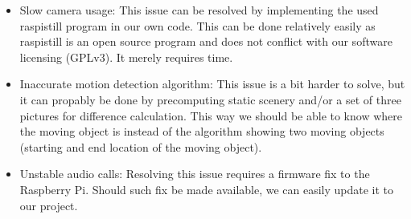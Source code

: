 \documentclass[english,11pt,twoside,a4paper]{article}
\begin{document}
\begin{itemize}
  \item Slow camera usage: This issue can be resolved by implementing the used raspistill program in our own code. This can be done relatively easily as raspistill is an open source program and does not conflict with our software licensing (GPLv3). It merely requires time.
  \item Inaccurate motion detection algorithm: This issue is a bit harder to solve, but it can propably be done by precomputing static scenery and/or a set of three pictures for difference calculation. This way we should be able to know where the moving object is instead of the algorithm showing two moving objects (starting and end location of the moving object).
  \item Unstable audio calls: Resolving this issue requires a firmware fix to the Raspberry Pi. Should such fix be made available, we can easily update it to our project.
\end{itemize}
\end{document}

